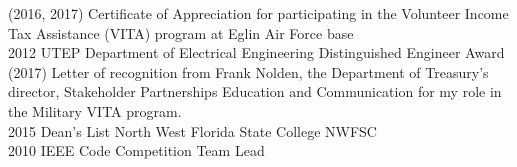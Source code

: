 (2016, 2017) Certificate of Appreciation for participating in the Volunteer Income Tax Assistance (VITA) program at Eglin Air Force base\\
2012 UTEP Department of Electrical Engineering Distinguished Engineer Award\\
(2017) Letter of recognition from Frank Nolden, the Department of Treasury's director, Stakeholder Partnerships Education and Communication for my role in the Military VITA program.\\
2015 Dean's List North West Florida State College NWFSC\\
2010 IEEE Code Competition Team Lead